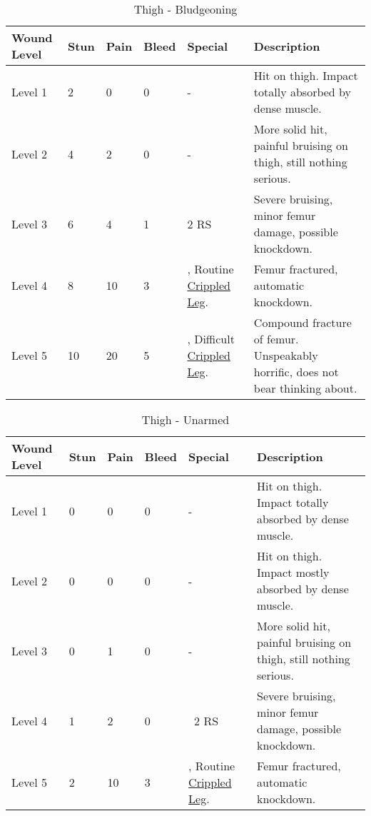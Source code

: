 \documentclass[oneside,11pt,english]{book}
\begin{document}
\begin{table}[hb] %
	\caption{Thigh - Bludgeoning}
	\label{wound:Thigh - Bludgeoning}
	\begin{tabu} to 
Wound Level &Stun &Pain &Bleed &Special &Description\\\toprule
Level 1& 2& 0& 0& - &Hit on thigh. Impact totally absorbed by dense muscle.\\
Level 2& 4& 2& 0& - &More solid hit, painful bruising on thigh, still nothing serious.\\
Level 3& 6& 4& 1&  2 RS &Severe bruising, minor femur damage, possible knockdown.\\
Level 4& 8& 10& 3
	&, \newline
		Routine~ \hyperref[bane:Crippled Limb/Appendage]{Crippled Leg}.
	&Femur fractured, automatic knockdown.\\
Level 5& 10& 20& 5
	&, \newline
		Difficult~ \hyperref[bane:Crippled Limb/Appendage]{Crippled Leg}.
	&Compound fracture of femur. Unspeakably horrific, does not bear thinking about.\\
	\end{tabu}
\end{table}

\begin{table}[!hb] %
	\caption{Thigh - Unarmed}
	\label{wound:Thigh - Unarmed}
	\begin{tabu} to 
Wound Level &Stun &Pain &Bleed &Special &Description\\\toprule
Level 1& 0& 0& 0& - &Hit on thigh. Impact totally absorbed by dense muscle.\\
Level 2& 0& 0& 0& - &Hit on thigh. Impact mostly absorbed by dense muscle.\\
Level 3& 0& 1& 0& - &More solid hit, painful bruising on thigh, still nothing serious.\\
Level 4& 1& 2& 0& ~2 RS &Severe bruising, minor femur damage, possible knockdown.\\
Level 5& 2& 10& 3
	&, \newline
		Routine~ \hyperref[bane:Crippled Limb/Appendage]{Crippled Leg}.
	&Femur fractured, automatic knockdown.\\
	\end{tabu}
\end{table}
	\clearpage
\end{document}
